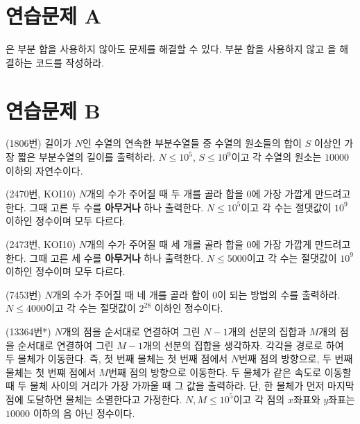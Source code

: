 \section{연습문제 A}
\begin{problem}
    은 부분 합을 사용하지 않아도 문제를 해결할 수 있다. 부분 합을 사용하지 않고 을 해결하는 코드를 작성하라.
\end{problem}

\section{연습문제 B}

\begin{problem}
    (1806번) 길이가 $N$인 수열의 연속한 부분수열들 중 수열의 원소들의 합이 $S$ 이상인 가장 짧은 부분수열의 길이를 출력하라. $N \leq 10^5$, $S \leq 10^9$이고 각 수열의 원소는 $10000$ 이하의 자연수이다.
\end{problem}

\begin{problem}
    (2470번, KOI10) $N$개의 수가 주어질 때 두 개를 골라 합을 $0$에 가장 가깝게 만드려고 한다. 그때 고른 두 수를 \textbf{아무거나} 하나 출력한다. $N \leq 10^5$이고 각 수는 절댓값이 $10^9$ 이하인 정수이며 모두 다르다.
\end{problem}

\begin{problem}
    (2473번, KOI10) $N$개의 수가 주어질 때 세 개를 골라 합을 $0$에 가장 가깝게 만드려고 한다. 그때 고른 세 수를 \textbf{아무거나} 하나 출력한다. $N \leq 5000$이고 각 수는 절댓값이 $10^9$ 이하인 정수이며 모두 다르다.
\end{problem}

\begin{problem}
    (7453번) $N$개의 수가 주어질 때 네 개를 골라 합이 $0$이 되는 방법의 수를 출력하라. $N \leq 4000$이고 각 수는 절댓값이 $2^28$ 이하인 정수이다.
\end{problem}

\begin{problem}
    (13364번*) $N$개의 점을 순서대로 연결하여 그린 $N-1$개의 선분의 집합과 $M$개의 점을 순서대로 연결하여 그린 $M-1$개의 선분의 집합을 생각하자. 각각을 경로로 하여 두 물체가 이동한다. 즉, 첫 번째 물체는 첫 번째 점에서 $N$번째 점의 방향으로, 두 번째 물체는 첫 번쨰 점에서 $M$번째 점의 방향으로 이동한다. 두 물체가 같은 속도로 이동할 때 두 물체 사이의 거리가 가장 가까울 때 그 값을 출력하라. 단, 한 물체가 먼저 마지막 점에 도달하면 물체는 소멸한다고 가정한다. $N, M \leq 10^5$이고 각 점의 $x$좌표와 $y$좌표는 $10000$ 이하의 음 아닌 정수이다.
\end{problem}

